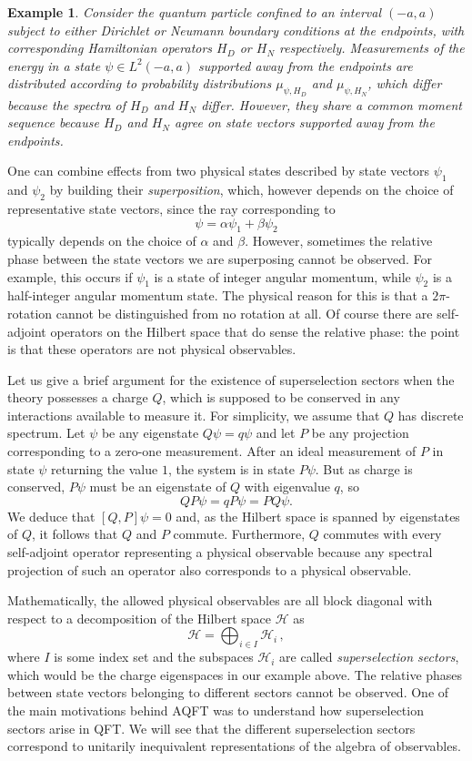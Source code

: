 \documentclass[12pt]{article}
\newcommand{\1}{\mathds{1}}                         %
\newcommand{\Hcal}{\mathcal {H}}
\newtheorem{example}[theorem]{Example}
\begin{document}
\begin{example} 
Consider the quantum particle confined to an interval $(-a,a)$ subject to either Dirichlet or Neumann boundary conditions at the endpoints, with corresponding Hamiltonian operators $H_D$ or $H_N$ respectively. Measurements of the energy in a state $\psi\in L^2(-a,a)$ supported away from the endpoints are distributed according to probability distributions $\mu_{\psi,H_D}$ and $\mu_{\psi,H_N}$, which differ because the spectra of $H_D$ and $H_N$ differ. However, they share a common moment sequence because $H_D$ and $H_N$ agree on state vectors supported away from the endpoints.
\end{example}
 

One can combine effects from two physical states described by state vectors $\psi_1$ and $\psi_2$ by building their \textit{superposition}, which, however depends on the choice of representative state vectors, since the ray corresponding to 
\[
\psi=\alpha \psi_1+\beta\psi_2
\] 
typically depends on the choice of $\alpha$ and $\beta$. However, sometimes the relative phase between the state vectors we are superposing cannot be observed. For example, this occurs if $\psi_1$ is a state of integer angular momentum, while $\psi_2$ is a half-integer angular momentum state. The physical reason for this is that a $2\pi$-rotation cannot be distinguished from no rotation at all. Of course there are self-adjoint operators on the Hilbert space that do sense the relative phase: the point is that these operators are not physical observables. 

Let us give a brief argument for the existence of superselection sectors when the theory possesses a charge $Q$, which is supposed to be conserved in any interactions available to measure it. For simplicity, we assume that $Q$ has discrete spectrum. Let $\psi$ be any eigenstate $Q\psi=q\psi$ and let $P$ be any projection corresponding to a zero-one measurement. After an ideal measurement of $P$ in state $\psi$ returning the value $1$, the system is in state $P\psi$. But as charge is conserved, $P\psi$ must be an eigenstate of $Q$ with eigenvalue $q$, so
\[
QP\psi = q P\psi = PQ\psi.
\]
We deduce that $[Q,P]\psi=0$ and, as the Hilbert space is spanned by eigenstates of $Q$, it follows that $Q$ and $P$ commute. Furthermore, $Q$ commutes with every self-adjoint operator representing a physical observable because any spectral projection of such an operator also corresponds to a physical observable.  

Mathematically, the allowed physical observables are all block diagonal with respect to a 
decomposition of the Hilbert space $\Hcal$ as
\[
\Hcal=\bigoplus_{i\in I} \Hcal_i\,,
\]
where $I$ is some index set and the subspaces $\Hcal_i$ are called \textit{superselection sectors}, which would be the charge eigenspaces in our example above. The relative phases between state vectors belonging to different sectors cannot be observed. One of the main motivations behind AQFT was to understand how superselection sectors arise in QFT. We will see that the different superselection sectors correspond to unitarily inequivalent representations of the algebra of observables. 
\end{document}
